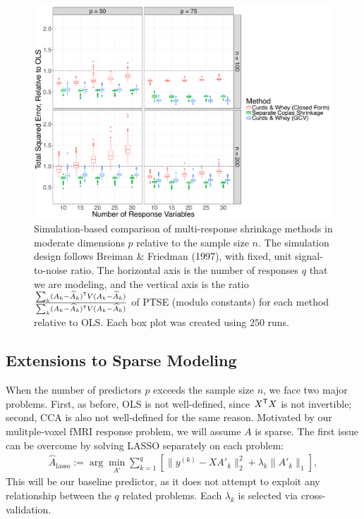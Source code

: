 \documentclass[main]{subfiles}
\begin{document}
\begin{figure}[h!]
\centering
\includegraphics[width = 16cm]{../curds_n_whey/TSE_curds.pdf}
\caption{Simulation-based comparison of multi-response shrinkage methods in moderate dimensions $p$ relative to the sample size $n$. The simulation design follows Breiman \& Friedman (1997), with fixed, unit signal-to-noise ratio. The horizontal axis is the number of responses $q$ that we are modeling, and the vertical axis is the ratio $\frac{\sum_k(A_k - \widetilde{A}_k)^\mathsf T V (A_k - \widetilde{A}_k)}{\sum_k(A_k - \widehat{A}_k)^\mathsf T V (A_k - \widehat{A}_k)}$ of PTSE (modulo constants) for each method relative to OLS. Each box plot was created using $250$ runs. } %
\label{fig-curds}
\end{figure}



\newpage
\subsection{Extensions to Sparse Modeling}

When the number of predictors $p$ exceeds the sample size $n$, we face two major problems. First, as before, OLS is not well-defined, since $X^\mathsf T X$ is not invertible; second, CCA is also not well-defined for the same reason. Motivated by our mulitple-voxel fMRI response problem, we will assume $A$ is sparse. The first issue can be overcome by solving LASSO separately on each problem:
\begin{align}
\label{eq-separate-lasso}
\widehat{A}_{\text{lasso}}
:= \arg\min_{A'}\sum_{k=1}^q \left[\|y^{(k)} - XA'_k\|_2^2 +  \lambda_k \|A'_k\|_1\right],
\end{align}
This will be our baseline predictor, as it does not attempt to exploit any relationship between the $q$ related problems. Each $\lambda_k$ is selected via cross-validation.
\end{document}
